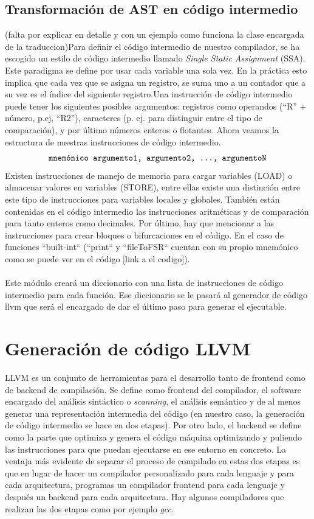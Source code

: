\subsection{Transformación de AST en código intermedio}
(falta por explicar en detalle y con un ejemplo como funciona la clase encargada de la traduccion)Para definir el código intermedio de nuestro compilador, se ha escogido un estilo de código intermedio llamado \textit{Single Static Assignment} (SSA). Este paradigma se define por usar cada variable una sola vez. En la práctica esto implica que cada vez que se asigna un registro, se suma uno a un contador que a su vez es el índice del siguiente registro.Una instrucción de código intermedio puede tener los siguientes posibles argumentos: registros como operandos (``R'' + número, p.ej, ``R2''), caracteres (p. ej. para distinguir entre el tipo de comparación), y por último números enteros o flotantes. Ahora veamos la estructura de nuestras instrucciones de código intermedio.
\[ 
\texttt{ mnemónico argumento1, argumento2, \dots, argumentoN } 
\]
Existen instrucciones de manejo de memoria para cargar variables (LOAD) o almacenar valores en variables (\textsc{STORE}), entre ellas existe una distinción entre este tipo de instrucciones para variables locales y globales. También están contenidas en el código intermedio las instrucciones aritméticas y de comparación para tanto enteros como decimales. Por último, hay que mencionar a las instrucciones para crear bloques o bifurcaciones en el código. En el caso de funciones ``built-int`` (``print`` y ``fileToFSR`` cuentan con su propio mnemónico como se puede ver en el código [link a el codigo]).\\\\
Este módulo creará un diccionario con una lista de instrucciones de código intermedio para cada función. Ese diccionario se le pasará al generador de código llvm que será el encargado de dar el último paso para generar el ejecutable. 
\section{Generación de código LLVM}
\noindent LLVM es un conjunto de herramientas para el desarrollo tanto de frontend como de backend de compilación. Se define como frontend del compilador, el software encargado del análisis sintáctico o \textit{scanning}, el análisis semántico y de al menos generar una representación intermedia del código (en nuestro caso, la generación de código intermedio se hace en dos etapas). Por otro lado, el backend se define como la parte que optimiza y genera el código máquina optimizando y puliendo las instrucciones para que puedan ejecutarse en ese entorno en concreto. La ventaja más evidente de separar el proceso de compilado en estas dos etapas es que en lugar de hacer un compilador personalizado para cada lenguaje y para cada arquitectura, programas un compilador frontend para cada lenguaje y después un backend para cada arquitectura. Hay algunos compiladores que realizan las dos etapas como por ejemplo \textit{gcc}.

